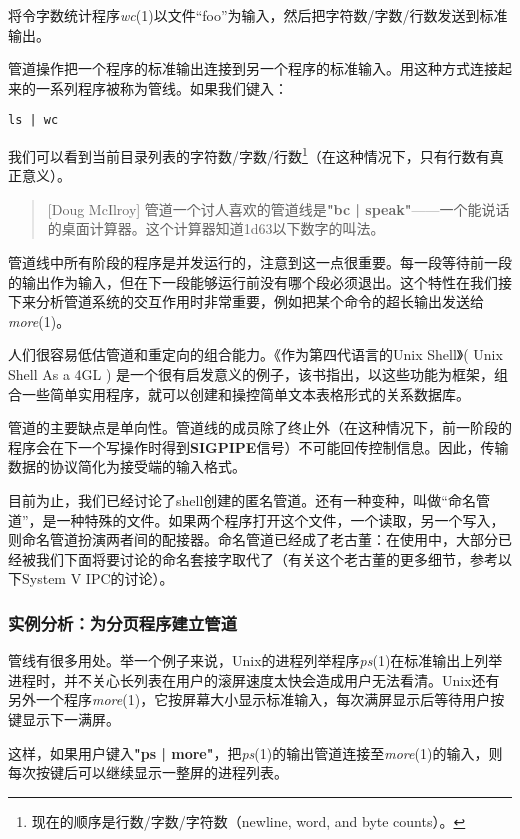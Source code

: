 \documentclass[12pt,oneside]{book}
\begin{document}
\begin{common-format}
将令字数统计程序\textit{wc}(1)以文件“foo”为输入，然后把字符数/字数/行数发送到标准输出。

管道操作把一个程序的标准输出连接到另一个程序的标准输入。用这种方式连接起来的一系列程序被称为管线。如果我们键入：
\begin{Verbatim}
ls | wc
\end{Verbatim}


我们可以看到当前目录列表的字符数/字数/行数\footnote{现在的顺序是行数/字数/字符数（newline, word, and byte counts）。}（在这种情况下，只有行数有真正意义）。

\begin{quote}[Doug McIlroy]
管道一个讨人喜欢的管道线是\textbf{"bc | speak"}——一个能说话的桌面计算器。这个计算器知道\num{1d63}以下数字的叫法。
\end{quote}

管道线中所有阶段的程序是并发运行的，注意到这一点很重要。每一段等待前一段的输出作为输入，但在下一段能够运行前没有哪个段必须退出。这个特性在我们接下来分析管道系统的交互作用时非常重要，例如把某个命令的超长输出发送给\textit{more}(1)。

人们很容易低估管道和重定向的组合能力。《作为第四代语言的Unix Shell》( Unix Shell As a 4GL ) \cite{Schaffer-Wolf}是一个很有启发意义的例子，该书指出，以这些功能为框架，组合一些简单实用程序，就可以创建和操控简单文本表格形式的关系数据库。

管道的主要缺点是单向性。管道线的成员除了终止外（在这种情况下，前一阶段的程序会在下一个写操作时得到\textbf{SIGPIPE}信号）不可能回传控制信息。因此，传输数据的协议简化为接受端的输入格式。

目前为止，我们已经讨论了shell创建的匿名管道。还有一种变种，叫做“命名管道”，是一种特殊的文件。如果两个程序打开这个文件，一个读取，另一个写入，则命名管道扮演两者间的配接器。命名管道已经成了老古董：在使用中，大部分已经被我们下面将要讨论的命名套接字取代了（有关这个老古董的更多细节，参考以下System V IPC的讨论）。


\subsubsection{实例分析：为分页程序建立管道}
管线有很多用处。举一个例子来说，Unix的进程列举程序\textit{ps}(1)在标准输出上列举进程时，并不关心长列表在用户的滚屏速度太快会造成用户无法看清。Unix还有另外一个程序\textit{more}(1)，它按屏幕大小显示标准输入，每次满屏显示后等待用户按键显示下一满屏。

这样，如果用户键入\textbf{"ps | more"}，把\textit{ps}(1)的输出管道连接至\textit{more}(1)的输入，则每次按键后可以继续显示一整屏的进程列表。


\end{common-format}
\end{document}
